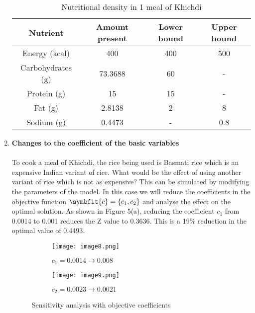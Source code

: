 \documentclass[
]{article}
\begin{document}
\begin{enumerate}
	      \begin{table}[h!]
	      	\centering
	      	\begin{tabular}{||c | c | c | c ||} 
	      		\hline
	      		Nutrient          & Amount present & Lower bound & Upper bound \\ [0.5ex] 
	      		\hline\hline
	      		Energy (kcal)     & 400            & 400         & 500         \\ 
	      		Carbohydrates (g) & 73.3688        & 60          & -           \\
	      		Protein (g)       & 15             & 15          & -           \\
	      		Fat (g)           & 2.8138         & 2           & 8           \\
	      		Sodium (g)        & 0.4473         & -           & 0.8         \\ [1ex] 
	      		\hline
	      	\end{tabular}
	      	\caption{Nutritional density in 1 meal of Khichdi}
	      	\label{table:2}
	      \end{table}
	      	          
	\item \textbf{Changes to the coefficient of the basic variables} \\
	      \\
	      To cook a meal of Khichdi, the rice being used is Basmati rice which is an expensive Indian variant of rice. What would be the effect of using another variant of rice which is not as expensive?
	      This can be simulated by modifying the parameters of the model. In this case we will reduce the coefficients in the objective function $\symbfit{c} = \{c_1, c_2 \}$ and analyse the effect on the optimal solution.
	      As shown in Figure 5(a), reducing the coefficient $c_1$ from 0.0014 to 0.001 reduces the Z value to 0.3636. This is a 19\% reduction in the optimal value of 0.4493.
	      	        
	      \begin{figure}[ht]
	      	\begin{subfigure}{.5\textwidth}
	      		\centering
	      		\texttt{[image: image8.png]}  
	      		\caption{\(c_1 = 0.0014 → 0.008\)}
	      		\label{fig:sub-first}
	      	\end{subfigure}
	      	\begin{subfigure}{.5\textwidth}
	      		\centering
	      		\texttt{[image: image9.png]}  
	      		\caption{\(c_2 = 0.0023 → 0.0021\)}
	      		\label{fig:sub-second}
	      	\end{subfigure}
	      	\caption{Sensitivity analysis with objective coefficients}
	      	\label{fig:fig}
	      \end{figure}
	      	      

\end{enumerate}
\end{document}
